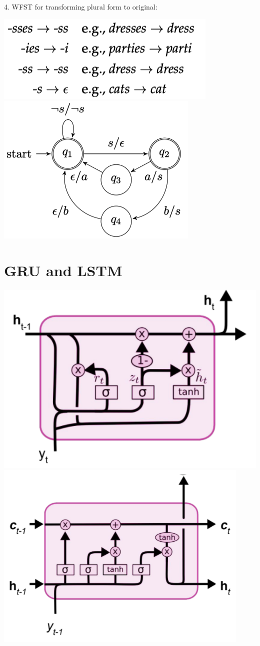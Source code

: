 4. WFST for transforming plural form to original:
\begin{center}
    \includegraphics[width=0.49\columnwidth]{img/WFST-plural-rules.png}
    \includegraphics[width=0.35\columnwidth]{img/WFST-plural.png}
\end{center}





\section{GRU and LSTM}
\begin{center}
    \includegraphics[width=0.4\columnwidth]{img/GRU.png}
    \includegraphics[width=0.4\columnwidth]{img/LSTM.png}
\end{center}
